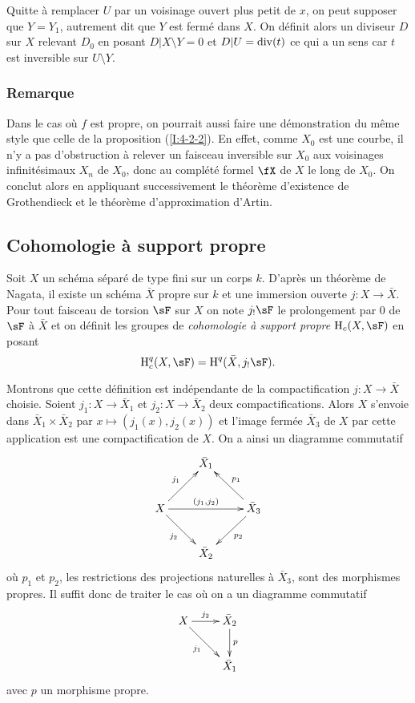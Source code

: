Quitte à remplacer $U$ par un voisinage ouvert plus petit de $x$, on peut 
supposer que $Y=Y_1$, autrement dit que $Y$ est fermé dans $X$. On définit 
alors un diviseur $D$ sur $X$ relevant $D_0$ en posant $D|X\setminus Y=0$ et 
$D|U=\operatorname{div}(t)$ ce qui a un sens car $t$ est inversible sur $U\setminus Y$. 





\subsubsection{Remarque}\label{I:4-4-2}

Dans le cas où $f$ est propre, on pourrait aussi faire une démonstration 
du même style que celle de la proposition (\ref{I:4-2-2}). En effet, comme 
$X_0$ est une courbe, il n'y a pas d'obstruction à relever un faisceau 
inversible sur $X_0$ aux voisinages infinitésimaux $X_n$ de $X_0$, donc au 
complété formel $\fX$ de $X$ le long de $X_0$. On conclut alors en 
appliquant successivement le théorème d'existence de Grothendieck et le 
théorème d'approximation d'Artin. 










\subsection{Cohomologie à support propre}\label{I:4-5}





\begin{definition}\label{I:4-5-1}
Soit $X$ un schéma séparé de type fini sur un corps $k$. D'après un 
théorème de Nagata, il existe un schéma $\bar X$ propre sur $k$ et une 
immersion ouverte $j:X\to\bar X$. Pour tout faisceau de torsion $\sF$ sur $X$ on 
note $j_! \sF$ le prolongement par $0$ de $\sF$ à $\bar X$ et on définit les 
groupes de \emph{cohomologie à support propre} $\h_c(X,\sF)$ en posant 
\[
  \h_c^q(X,\sF)=\h^q(\bar X, j_! \sF) \text{.}
\]
\end{definition}

Montrons que cette définition est indépendante de la compactification 
$j:X\to\bar X$ choisie. Soient $j_1:X\to \bar X_1$ et $j_2:X\to \bar X_2$ deux 
compactifications. Alors $X$ s'envoie dans $\bar X_1\times \bar X_2$ par 
$x\mapsto (j_1(x),j_2(x))$ et l'image fermée $\bar X_3$ de $X$ par cette 
application est une compactification de $X$. On a ainsi un diagramme commutatif 
\[\xymatrix{
  & \bar X_1 \\
  X \ar[ur]^-{j_1} \ar[rr]^-{(j_1,j_2)} \ar[dr]_-{j_2} 
    & & \bar X_3 \ar[ul]_-{p_1} \ar[dl]^-{p_2} \\
  & \bar X_2
}\]
où $p_1$ et $p_2$, les restrictions des projections naturelles à 
$\bar X_3$, sont des morphismes propres. Il suffit donc de traiter le cas où 
on a un diagramme commutatif 
\[\xymatrix{
  X \ar[r]^-{j_2} \ar[dr]_-{j_1} 
    & \bar X_2 \ar[d]^-p \\
  & \bar X_1
}\]
avec $p$ un morphisme propre. 





